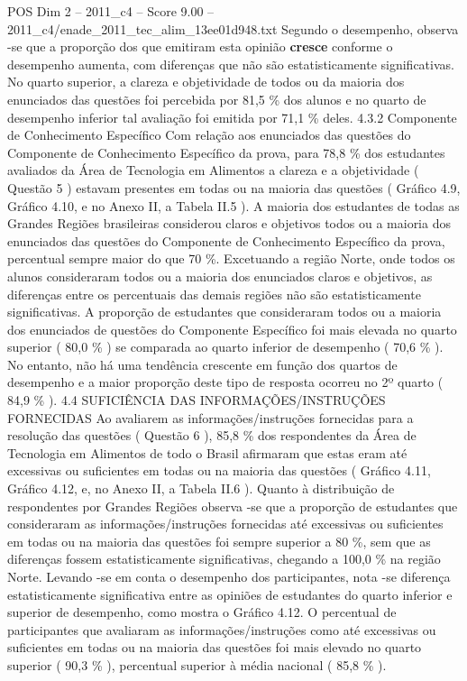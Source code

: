 \begin{textsample}{POS Dim 2 – 2011\_c4 – Score 9.00 – 2011\_c4/enade\_2011\_tec\_alim\_13ee01d948.txt}
Segundo o desempenho, observa -se que a proporção dos que emitiram esta opinião \textbf{cresce} conforme o desempenho aumenta, com diferenças que não são estatisticamente significativas.
No quarto superior, a clareza e objetividade de todos ou da maioria dos enunciados das questões foi percebida por 81,5 \% dos alunos e no quarto de desempenho inferior tal avaliação foi emitida por 71,1 \% deles. 4.3.2 Componente de Conhecimento Específico Com relação aos enunciados das questões do Componente de Conhecimento Específico da prova, para 78,8 \% dos estudantes avaliados da Área de Tecnologia em Alimentos a clareza e a objetividade ( Questão 5 ) estavam presentes em todas ou na maioria das questões ( Gráfico 4.9, Gráfico 4.10, e no Anexo II, a Tabela II.5 ).
A maioria dos estudantes de todas as Grandes Regiões brasileiras considerou claros e objetivos todos ou a maioria dos enunciados das questões do Componente de Conhecimento Específico da prova, percentual sempre maior do que 70 \%.
Excetuando a região Norte, onde todos os alunos consideraram todos ou a maioria dos enunciados claros e objetivos, as diferenças entre os percentuais das demais regiões não são estatisticamente significativas.
A proporção de estudantes que consideraram todos ou a maioria dos enunciados de questões do Componente Específico foi mais elevada no quarto superior ( 80,0 \% ) se comparada ao quarto inferior de desempenho ( 70,6 \% ).
No entanto, não há uma tendência crescente em função dos quartos de desempenho e a maior proporção deste tipo de resposta ocorreu no 2º quarto ( 84,9 \% ). 4.4 SUFICIÊNCIA DAS INFORMAÇÕES/INSTRUÇÕES FORNECIDAS Ao avaliarem as informações/instruções fornecidas para a resolução das questões ( Questão 6 ), 85,8 \% dos respondentes da Área de Tecnologia em Alimentos de todo o Brasil afirmaram que estas eram até excessivas ou suficientes em todas ou na maioria das questões ( Gráfico 4.11, Gráfico 4.12, e, no Anexo II, a Tabela II.6 ).
Quanto à distribuição de respondentes por Grandes Regiões observa -se que a proporção de estudantes que consideraram as informações/instruções fornecidas até excessivas ou suficientes em todas ou na maioria das questões foi sempre superior a 80 \%, sem que as diferenças fossem estatisticamente significativas, chegando a 100,0 \% na região Norte.
Levando -se em conta o desempenho dos participantes, nota -se diferença estatisticamente significativa entre as opiniões de estudantes do quarto inferior e superior de desempenho, como mostra o Gráfico 4.12.
O percentual de participantes que avaliaram as informações/instruções como até excessivas ou suficientes em todas ou na maioria das questões foi mais elevado no quarto superior ( 90,3 \% ), percentual superior à média nacional ( 85,8 \% ).

\end{textsample}
